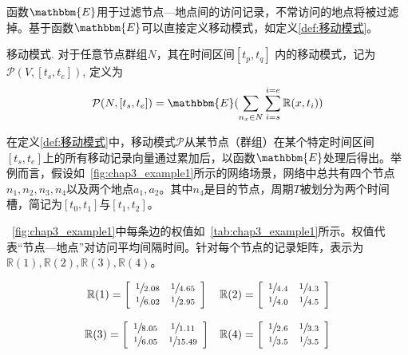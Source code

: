 函数$\mathbbm{E}$用于过滤节点—地点间的访问记录，不常访问的地点将被过滤掉。基于函数$\mathbbm{E}$可以直接定义移动模式，如定义\ref{def:移动模式}。

\begin{definition} 移动模式.
对于任意节点群组$N$，其在时间区间$[t_p,t_q]$ 内的移动模式，记为$\mathcal{P}(V,[t_s,t_e])$, 定义为
\begin{equation}
\mathcal{P}(N,[t_s,t_e])= \mathbbm{E}(\sum_{n_x \in N}\sum_{i=s}^{i=e}\mathbb{R}(x,t_i))
\label{eq:pattern}
\end{equation}
\label{def:移动模式}
\end{definition}

在定义\ref{def:移动模式}中，移动模式$\mathcal{P}$从某节点（群组）在某个特定时间区间$[t_s,t_e]$上的所有移动记录向量通过累加后，以函数$\mathbbm{E}$处理后得出。举例而言，假设如\figurename~\ref{fig:chap3_example1}所示的网络场景，网络中总共有四个节点$n_1,n_2,n_3,n_4$以及两个地点$a_1,a_2$。其中$n_4$是目的节点，周期$T$被划分为两个时间槽，简记为$[t_0,t_1]$与$[t_1,t_2]$。



\figurename~\ref{fig:chap3_example1}中每条边的权值如\tablename~\ref{tab:chap3_example1}所示。权值代表“节点—地点”对访问平均间隔时间。针对每个节点的记录矩阵，表示为$\mathbb{R}(1),\mathbb{R}(2),\mathbb{R}(3),\mathbb{R}(4)$。

\[
\begin{array}{cc}
\mathbb{R}(1)=\left[
\begin{array}{cc}
\sfrac{1}{2.08} & \sfrac{1}{4.65} \\
\sfrac{1}{6.02} & \sfrac{1}{2.95}
\end{array}\right]&
\mathbb{R}(2)=\left[
\begin{array}{cc}
\sfrac{1}{4.4} & \sfrac{1}{4.3} \\
\sfrac{1}{4.0} & \sfrac{1}{4.5}
\end{array}\right]    \\ \\
\mathbb{R}(3)=\left[
\begin{array}{cc}
\sfrac{1}{8.05} & \sfrac{1}{1.11} \\
\sfrac{1}{6.05} & \sfrac{1}{15.49}
\end{array}\right]
&
\mathbb{R}(4)=\left[
\begin{array}{cc}
\sfrac{1}{2.6} & \sfrac{1}{3.3} \\
\sfrac{1}{3.5} & \sfrac{1}{3.5}
\end{array}\right]
\end{array}
\]

